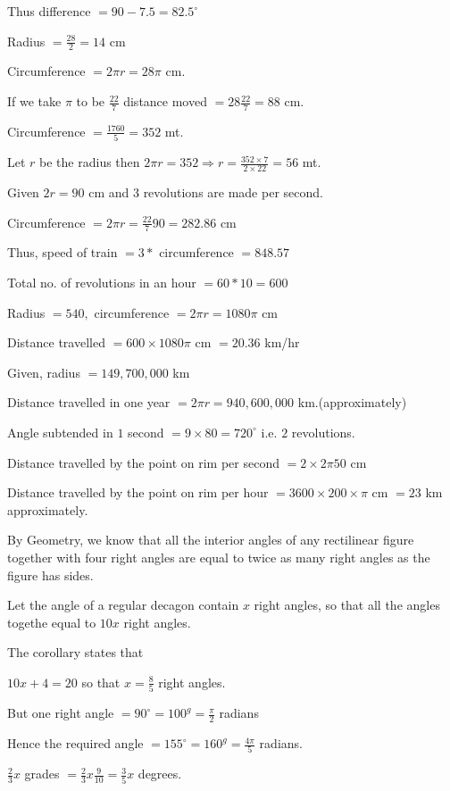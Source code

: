     Thus difference $= 90 - 7.5 = 82.5^\circ$
\item Radius $= \frac{28}{2} = 14$ cm

    Circumference $= 2\pi r = 28\pi$ cm.

    If we take $\pi$ to be $\frac{22}{7}$ distance moved $= 28\frac{22}{7} = 88$ cm.
\item Circumference $= \frac{1760}{5} = 352$ mt.

    Let $r$ be the radius then $2\pi r = 352 \Rightarrow r = \frac{352\times 7}{2\times 22} = 56$ mt.
\item Given $2r = 90$ cm and $3$ revolutions are made per second.

    Circumference $= 2\pi r = \frac{22}{7}90 = 282.86$ cm

    Thus, speed of train $= 3*$ circumference $= 848.57$
\item Total no. of revolutions in an hour $= 60*10 = 600$

    Radius $= 540,$ circumference $= 2\pi r = 1080\pi$ cm

    Distance travelled $= 600\times 1080\pi$ cm $= 20.36$ km/hr
\item Given, radius $= 149,700,000$ km

    Distance travelled in one year $= 2\pi r = 940,600,000$ km.(approximately)
\item Angle subtended in $1$ second $= 9\times 80 = 720^\circ$ i.e. $2$ revolutions.

    Distance travelled by the point on rim per second $= 2\times 2\pi 50$ cm

    Distance travelled by the point on rim per hour $= 3600\times 200\times \pi$ cm $= 23$ km approximately.
\item By Geometry, we know that all the interior angles of any rectilinear figure together with four right angles are equal to twice
    as many right angles as the figure has sides.

    Let the angle of a regular decagon contain $x$ right angles, so that all the angles togethe equal to $10x$ right
    angles.

    The corollary states that

    $10 x + 4 = 20$ so that $x = \frac{8}{5}$ right angles.

    But one right angle $= 90^\circ = 100^g = \frac{\pi}{2}$ radians

    Hence the required angle $= 155^\circ= 160^g = \frac{4\pi}{5}$ radians.
\item $\frac{2}{3}x$ grades $= \frac{2}{3}x\frac{9}{10} = \frac{3}{5}x$ degrees.

